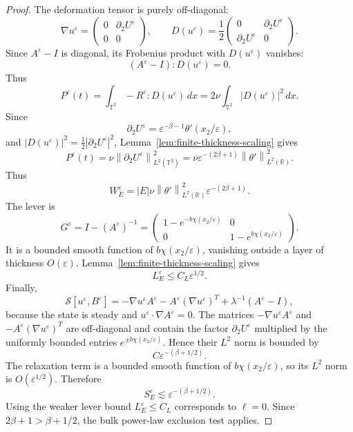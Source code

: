 \documentclass[10pt,a4paper]{amsart}
\newcommand{\Id}{I}
\newcommand{\R}{\mathbb R}
\newcommand{\T}{\mathbb T}
\newcommand{\eps}{\varepsilon}
\newcommand{\norm}[1]{\left\lVert #1\right\rVert}
\begin{document}
\begin{proof}
The deformation tensor is purely off-diagonal:
\[
  \nabla u^\varepsilon
  =
  \begin{pmatrix}
  0&\partial_2U^\varepsilon\\
  0&0
  \end{pmatrix},
  \qquad
  D(u^\varepsilon)
  =
  \frac12
  \begin{pmatrix}
  0&\partial_2U^\varepsilon\\
  \partial_2U^\varepsilon&0
  \end{pmatrix}.
\]
Since \(A^\varepsilon-\Id\) is diagonal, its Frobenius product with
\(D(u^\varepsilon)\) vanishes:
\[
  (A^\varepsilon-\Id):D(u^\varepsilon)=0.
\]
Thus
\[
  P^\varepsilon(t)
  =
  \int_{\T^2}-R^\varepsilon:D(u^\varepsilon)\,dx
  =
  2\nu\int_{\T^2}|D(u^\varepsilon)|^2\,dx .
\]
Since
\[
  \partial_2U^\varepsilon
  =
  \varepsilon^{-\beta-1}\theta'(x_2/\varepsilon),
\]
and \(|D(u^\eps)|^2=\frac12|\partial_2U^\eps|^2\), Lemma~\ref{lem:finite-thickness-scaling}
gives
\[
  P^\eps(t)
  =
  \nu\norm{\partial_2U^\eps}_{L^2(\T^2)}^2
  =
  \nu\eps^{-(2\beta+1)}\norm{\theta'}_{L^2(\R)}^2.
\]
Thus
\[
  W_E^\eps
  =
  |E|\nu\norm{\theta'}_{L^2(\R)}^2
  \eps^{-(2\beta+1)}.
  \label{eq:W-exact-scale}
\]
The lever is
\[
  G^\varepsilon
  =
  \Id-(A^\varepsilon)^{-1}
  =
  \begin{pmatrix}
  1-e^{-b\chi(x_2/\eps)}&0\\
  0&1-e^{b\chi(x_2/\eps)}
  \end{pmatrix}.
\]
It is a bounded smooth function of \(b\chi(x_2/\eps)\), vanishing outside a
layer of thickness \(O(\eps)\).  Lemma~\ref{lem:finite-thickness-scaling} gives
\[
  L_E^\varepsilon\le C_L\eps^{1/2}.
  \label{eq:L-layer-scale}
\]
Finally,
\[
  \mathcal S[u^\varepsilon,B^\varepsilon]
  =
  -\nabla u^\varepsilon A^\varepsilon
  -A^\varepsilon(\nabla u^\varepsilon)^T
  +\lambda^{-1}(A^\varepsilon-\Id),
\]
because the state is steady and \(u^\varepsilon\cdot\nabla A^\varepsilon=0\).
The matrices \(-\nabla u^\varepsilon A^\varepsilon\) and
\(-A^\varepsilon(\nabla u^\varepsilon)^T\) are off-diagonal and contain the
factor \(\partial_2U^\varepsilon\) multiplied by the uniformly bounded
entries \(e^{\pm b\chi(x_2/\eps)}\).  Hence their \(L^2\) norm is bounded by
\[
  C\eps^{-(\beta+1/2)}.
\]
The relaxation term is a bounded smooth function of \(b\chi(x_2/\eps)\), so its
\(L^2\) norm is \(O(\eps^{1/2})\).  Therefore
\[
  S_E^\varepsilon\lesssim\varepsilon^{-(\beta+1/2)}.
\]
Using the weaker lever bound \(L_E^\varepsilon\le C_L\) corresponds to
\(\ell=0\).  Since \(2\beta+1>\beta+1/2\), the bulk power-law exclusion test
applies.
\end{proof}
\end{document}
